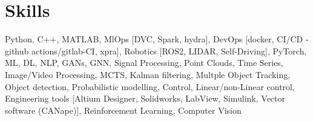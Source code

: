 \documentclass[12pt, a4paper]{extarticle}
\newcommand*{\sectionformat}{\centering}
\begin{document}
\section*{\sectionformat Skills}
Python, C++, MATLAB, MlOps [DVC, Spark, hydra], DevOps [docker, CI/CD - github actions/gitlab-CI, xpra], Robotics [ROS2, LIDAR, Self-Driving], PyTorch, ML, DL, NLP, GANs, GNN, Signal Processing, Point Clouds, Time Series, Image/Video Processing,  MCTS, Kalman filtering, Multple Object Tracking, Object detection, Probabilistic modelling, Control, Linear/non-Linear control, Engineering tools [Altium Designer, Solidworks, LabView, Simulink,  Vector software (CANape)], Reinforcement Learning, Computer Vision
\end{document}
